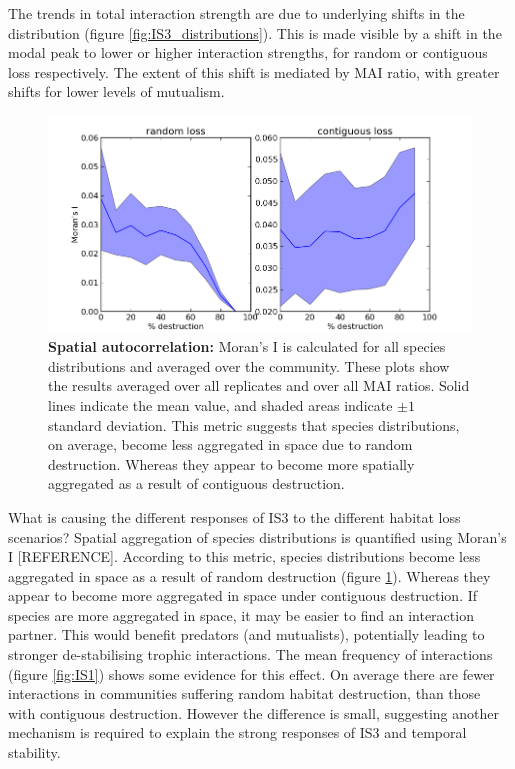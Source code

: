 The trends in total interaction strength are due to underlying shifts in the distribution (figure \ref{fig:IS3_distributions}). This is made visible by a shift in the modal peak to lower or higher interaction strengths, for random or contiguous loss respectively. The extent of this shift is mediated by MAI ratio, with greater shifts for lower levels of mutualism.


\begin{figure}[ht!]
		\centering      
        \includegraphics[width=\textwidth]{"comparison_plots/compare_moransI_mean"}
        \caption{\textbf{Spatial autocorrelation:} Moran's I is calculated for all species distributions and averaged over the community. These plots show the results averaged over all replicates and over all MAI ratios. Solid lines indicate the mean value, and shaded areas indicate $\pm 1$ standard deviation. This metric suggests that species distributions, on average, become less aggregated in space due to random destruction. Whereas they appear to become more spatially aggregated as a result of contiguous destruction.}\label{fig:morans_i}
\end{figure}


What is causing the different responses of IS3 to the different habitat loss scenarios? Spatial aggregation of species distributions is quantified using Moran's I [REFERENCE]. According to this metric, species distributions become less aggregated in space as a result of random destruction (figure \ref{fig:morans_i}). Whereas they appear to become more aggregated in space under contiguous destruction. If species are more aggregated in space, it may be easier to find an interaction partner. This would benefit predators (and mutualists), potentially leading to stronger de-stabilising trophic interactions. The mean frequency of interactions (figure \ref{fig:IS1}) shows some evidence for this effect. On average there are fewer interactions in communities suffering random habitat destruction, than those with contiguous destruction. However the difference is small, suggesting another mechanism is required to explain the strong responses of IS3 and temporal stability. 


